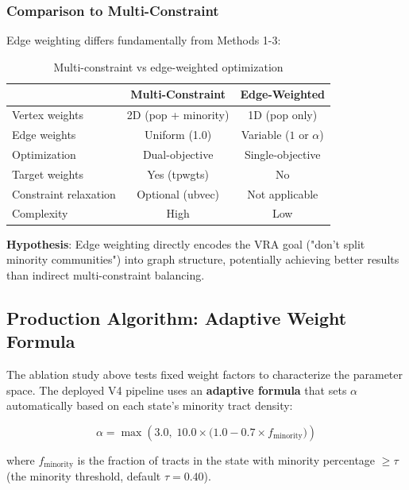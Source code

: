 \subsubsection{Comparison to Multi-Constraint}

Edge weighting differs fundamentally from Methods 1-3:

\begin{table}[h]
\centering
\small
\begin{tabular}{lcc}
\toprule
& Multi-Constraint & Edge-Weighted \\
\midrule
Vertex weights & 2D (pop + minority) & 1D (pop only) \\
Edge weights & Uniform (1.0) & Variable ($1$ or $\alpha$) \\
Optimization & Dual-objective & Single-objective \\
Target weights & Yes (tpwgts) & No \\
Constraint relaxation & Optional (ubvec) & Not applicable \\
Complexity & High & Low \\
\bottomrule
\end{tabular}
\caption{Multi-constraint vs edge-weighted optimization}
\label{tab:method_comparison}
\end{table}

\textbf{Hypothesis}: Edge weighting directly encodes the VRA goal ("don't split minority communities") into graph structure, potentially achieving better results than indirect multi-constraint balancing.

\subsection{Production Algorithm: Adaptive Weight Formula}
\label{sec:adaptive_formula}

The ablation study above tests fixed weight factors to characterize the parameter space. The deployed V4 pipeline uses an \textbf{adaptive formula} that sets $\alpha$ automatically based on each state's minority tract density:

\begin{equation}
\alpha = \max\!\left(3.0,\; 10.0 \times \bigl(1.0 - 0.7 \times f_{\text{minority}}\bigr)\right)
\label{eq:adaptive_boost}
\end{equation}

where $f_{\text{minority}}$ is the fraction of tracts in the state with minority percentage $\geq \tau$ (the minority threshold, default $\tau = 0.40$).

